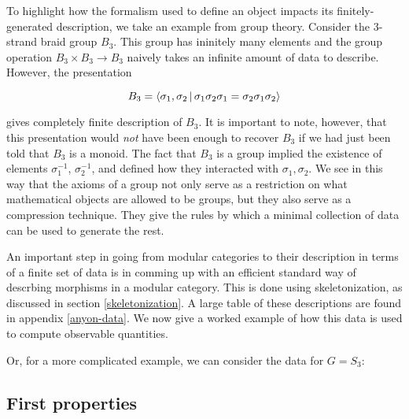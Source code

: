 \begin{ex}
To highlight how the formalism used to define an object impacts its finitely-generated description, we take an example from group theory. Consider the 3-strand braid group $B_3$. This group has ininitely many elements and the group operation $B_3\times B_3\to B_3$ naively takes an infinite amount of data to describe. However, the presentation

$$B_3=\Braket{\sigma_1, \sigma_2 | \sigma_1 \sigma_2 \sigma_1 = \sigma_2 \sigma_1 \sigma_2}$$

gives  completely finite description of $B_3$. It is important to note, however, that this presentation would \textit{not} have been enough to recover $B_3$ if we had just been told that $B_3$ is a monoid. The fact that $B_3$ is a group implied the existence of elements $\sigma_1^{-1}$, $\sigma_{2}^{-1}$, and defined how they interacted with $\sigma_1,\sigma_2$. We see in this way that the axioms of a group not only serve as a restriction on what mathematical objects are allowed to be groups, but they also serve as a compression technique. They give the rules by which a minimal collection of data can be used to generate the rest.
\end{ex}


An important step in going from modular categories to their description in terms of a finite set of data is in comming up with an efficient standard way of descrbing morphisms in a modular category. This is done using skeletonization, as discussed in section \ref{skeletonization}. A large table of these descriptions are found in appendix \ref{anyon-data}. We now give a worked example of how this data is used to compute observable quantities.

\begin{ex}
\end{ex}

\begin{ex}
Or, for a more complicated example, we can consider the data for $G=S_3$:
\end{ex}

\begin{ex}
\end{ex}

\subsection{First properties}

